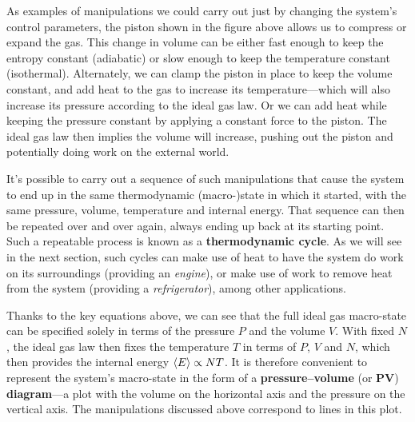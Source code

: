 As examples of manipulations we could carry out just by changing the system's control parameters, the piston shown in the figure above allows us to compress or expand the gas.
This change in volume can be either fast enough to keep the entropy constant (adiabatic) or slow enough to keep the temperature constant (isothermal).
Alternately, we can clamp the piston in place to keep the volume constant, and add heat to the gas to increase its temperature---which will also increase its pressure according to the ideal gas law.
Or we can add heat while keeping the pressure constant by applying a constant force to the piston.
The ideal gas law then implies the volume will increase, pushing out the piston and potentially doing work on the external world.

It's possible to carry out a sequence of such manipulations that cause the system to end up in the same thermodynamic (macro-)state in which it started, with the same pressure, volume, temperature and internal energy.
That sequence can then be repeated over and over again, always ending up back at its starting point.
Such a repeatable process is known as a \textbf{thermodynamic cycle}.
As we will see in the next section, such cycles can make use of heat to have the system do work on its surroundings (providing an \textit{engine}), or make use of work to remove heat from the system (providing a \textit{refrigerator}), among other applications.

Thanks to the key equations above, we can see that the full ideal gas macro-state can be specified solely in terms of the pressure $P$ and the volume $V$.
With fixed $N$, the ideal gas law then fixes the temperature $T$ in terms of $P$, $V$ and $N$, which then provides the internal energy $\left\langle E \right\rangle \propto NT$.
It is therefore convenient to represent the system's macro-state in the form of a \textbf{pressure--volume} (or $\mathbf{PV}$) \textbf{diagram}---a plot with the volume on the horizontal axis and the pressure on the vertical axis.
The manipulations discussed above correspond to lines in this plot.


